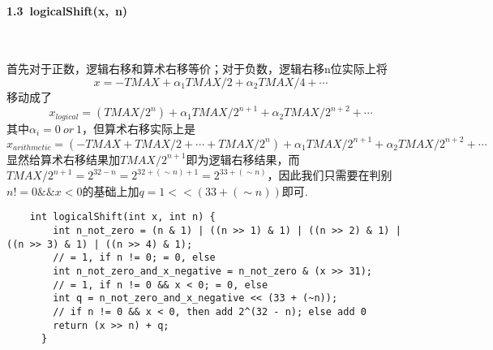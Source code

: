 \documentclass[UTF8]{ctexart}
\begin{document}
\paragraph*{1.3\ logicalShift(x,\ n)}\ \par
首先对于正数，逻辑右移和算术右移等价；对于负数，逻辑右移n位实际上将$$x=-TMAX+\alpha_1 TMAX/2+\alpha_2 TMAX/4+\cdots$$
移动成了$$x_{logical}=(TMAX/{2^n})+\alpha_1 TMAX/{2^{n+1}}+\alpha_2 TMAX/{2^{n+2}}+\cdots$$
其中$\alpha_i=0\ or\ 1$，但算术右移实际上是
$$x_{arithmetic}=(-TMAX+TMAX/2+\cdots+TMAX/2^{n})+\alpha_1 TMAX/{2^{n+1}}+\alpha_2 TMAX/{2^{n+2}}+\cdots$$
显然给算术右移结果加$TMAX/2^{n+1}$即为逻辑右移结果，而$TMAX/2^{n+1}=2^{32 - n}=2^{32 +(\sim n) +1}=2^{33+(\sim n)}$，因此我们只需要在判别$n!=0 \&\& x < 0$的基础上加$q=1<<(33+(\sim n))$即可.
\begin{lstlisting}
    int logicalShift(int x, int n) {
        int n_not_zero = (n & 1) | ((n >> 1) & 1) | ((n >> 2) & 1) | ((n >> 3) & 1) | ((n >> 4) & 1);
        // = 1, if n != 0; = 0, else
        int n_not_zero_and_x_negative = n_not_zero & (x >> 31);
        // = 1, if n != 0 && x < 0; = 0, else
        int q = n_not_zero_and_x_negative << (33 + (~n));
        // if n != 0 && x < 0, then add 2^(32 - n); else add 0
        return (x >> n) + q;
      }
\end{lstlisting}
\end{document}
